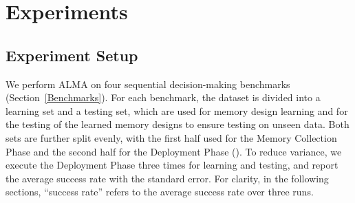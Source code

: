 \documentclass{article}
\theoremstyle{plain}
\theoremstyle{definition}
\theoremstyle{remark}
\newcommand{\ouralgo}{ALMA\xspace} %
\begin{document}
\section{Experiments}
\label{Experiment}

\subsection{Experiment Setup}
\label{Exp setup}
We perform \ouralgo on four sequential decision-making benchmarks (Section~\ref{Benchmarks}).
For each benchmark, the dataset is divided into a learning set and a testing set, which are used for memory design learning and for the testing of the learned memory designs to ensure testing on unseen data.  
Both sets are further split evenly, with the first half used for the Memory Collection Phase and the second half for the Deployment Phase (). To reduce variance, we execute the Deployment Phase three times for learning and testing, and report the average success rate with the standard error.
For clarity, in the following sections, ``success rate'' refers to the average success rate over three runs. 
\end{document}
